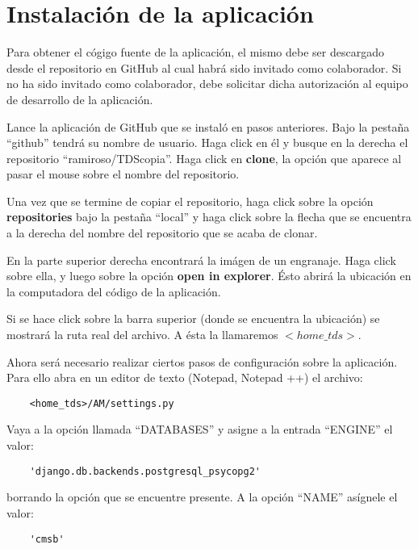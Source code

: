 \documentclass[9pt, letterpaper, oneside]{report}
\begin{document}
\chapter{Instalación de la aplicación}

  Para obtener el cógigo fuente de la aplicación, el mismo debe ser descargado
  desde el repositorio en GitHub al cual habrá sido invitado como colaborador. Si
  no ha sido invitado como colaborador, debe solicitar dicha autorización al
  equipo de desarrollo de la aplicación.

  Lance la aplicación de GitHub que se instaló en pasos anteriores. Bajo la pestaña
  ``github'' tendrá su nombre de usuario. Haga click en él y busque en la derecha el
  repositorio ``ramiroso/TDScopia''. Haga click en \textbf{clone}, la opción
  que aparece al pasar el mouse sobre el nombre del repositorio.

  Una vez que se termine de copiar el repositorio, haga click sobre la opción
  \textbf{repositories} bajo la pestaña ``local'' y haga click sobre la flecha que se
  encuentra a la derecha del nombre del repositorio que se acaba de clonar.

  En la parte superior derecha encontrará la imágen de un engranaje. Haga click
  sobre ella, y luego sobre la opción \textbf{open in explorer}. Ésto abrirá
  la ubicación en la computadora del código de la aplicación.

  Si se hace click sobre la barra superior (donde se encuentra la ubicación) se 
  mostrará la ruta real del archivo. A ésta la llamaremos $<home\_tds>$.

  Ahora será necesario realizar ciertos pasos de configuración sobre la aplicación.
  Para ello abra en un editor de texto (Notepad, Notepad ++) el archivo:

  \begin{verbatim}
    <home_tds>/AM/settings.py
  \end{verbatim}

  Vaya a la opción llamada ``DATABASES'' y asigne a la entrada ``ENGINE'' el
  valor:

  \begin{verbatim}
    'django.db.backends.postgresql_psycopg2'
  \end{verbatim}
  
  borrando la opción que se encuentre presente. A la opción ``NAME'' asígnele el
  valor: 
  
  \begin{verbatim}
    'cmsb'
  \end{verbatim}
\end{document}
